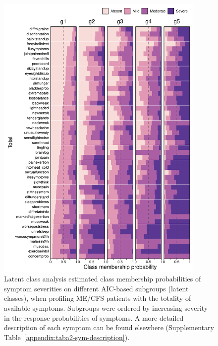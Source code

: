 \begin{figure}[htbp]
    \centering
    \includegraphics[width=0.9\textwidth]{chapter/2024-sym-domains/figures/fig3-lca-response-probabilities-aic-total-absent.pdf}
    \caption[Latent class analysis estimated class membership probabilities of symptom severities on different AIC-based subgroups, when profiling ME/CFS patients with the totality of available symptoms]{Latent class analysis estimated class membership probabilities of symptom severities on different AIC-based subgroups (latent classes), when profiling ME/CFS patients with the totality of available symptoms. Subgroups were ordered by increasing severity in the response probabilities of symptoms. A more detailed description of each symptom can be found elsewhere (Supplementary Table~\ref{appendix:taba2-sym-description}).}
    \label{fig:fig3-lca-response-probabilities-aic-total-absent}
\end{figure}


